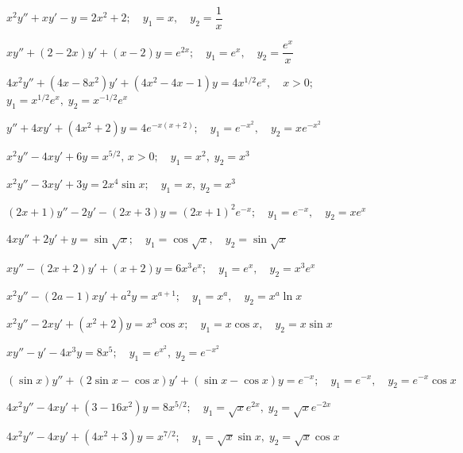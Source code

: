\begin{exerciselist}
\item\label{exer:5.7.7}$x^2y''+xy'- y=2x^2+2;   \quad y_1=x,
\quad y_2=\dfrac{1}{x}$

\item\label{exer:5.7.8}$xy''+(2-2x)y'+(x-2)y=e^{2x};   \quad y_1=e^x,
\quad y_2=\dfrac{e^x}{x}$

\item\label{exer:5.7.9}$4x^2y''+(4x-8x^2)y'+(4x^2-4x-1)y=4x^{1/2}e^x, \quad   x > 0$;
\newline $y_1=x^{1/2} e^x,\;  y_2=x^{-1/2}e^x$

\item\label{exer:5.7.10}$y''+4xy'+(4x^2+2)y=4e^{-x(x+2)};\quad   y_1=e^{-x^2},
\quad y_2=xe^{-x^2}$

\item\label{exer:5.7.11}$x^2y''-4xy'+6y=x^{5/2},\, x > 0;\quad  y_1=x^2,\;  y_2=x^3$

\item\label{exer:5.7.12}$x^2y''-3xy'+3y=2x^4\sin x; \quad  y_1=x,\;  y_2=x^3$

\item\label{exer:5.7.13}$(2x+1)y''-2y'-(2x+3)y=(2x+1)^2e^{-x}; \quad  y_1=e^{-x},
\quad y_2=xe^x$

\item\label{exer:5.7.14}$4xy''+2y'+y=\sin\sqrt x; \quad  y_1=\cos\sqrt x,
\quad y_2=\sin\sqrt x$

\item\label{exer:5.7.15}$xy''-(2x+2)y'+(x+2)y=6x^3e^x;\quad  y_1=e^x,\quad  y_2=x^3e^x$

\item\label{exer:5.7.16}$x^2y''-(2a-1)xy'+a^2y=x^{a+1}; \quad  y_1=x^a,
\quad y_2=x^a \ln x$

\item\label{exer:5.7.17}$x^2y''-2xy'+(x^2+2)y=x^3\cos x; \quad  y_1=x\cos x,
\quad y_2=x\sin x$

\item\label{exer:5.7.18}$xy''-y'-4x^3y=8x^5;\quad  y_1=e^{x^2},\;  y_2=e^{-x^2}$

\item\label{exer:5.7.19}$(\sin x)y''+(2\sin x-\cos x)y'+(\sin x-\cos x)y=e^{-x}; \quad
y_1=e^{-x},\quad y_2=e^{-x}\cos x$

\item\label{exer:5.7.20}$4x^2y''-4xy'+(3-16x^2)y=8x^{5/2}; \quad  y_1=\sqrt xe^{2x},\;  y_2=\sqrt
xe^{-2x}$

\item\label{exer:5.7.21}$ 4x^2y''-4xy'+(4x^2+3)y=x^{7/2}; \quad  y_1=\sqrt x\sin x,\;
y_2=\sqrt x\cos x$


\end{exerciselist}
